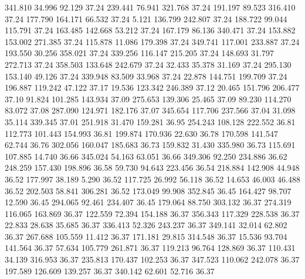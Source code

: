  341.810   34.996   92.129        37.24
 239.441   76.941  321.768        37.24
 191.197   89.523  316.410        37.24
 177.790  164.171   66.532        37.24
   5.121  136.799  242.807        37.24
 188.722   99.044  115.791        37.24
 163.485  142.668   53.212        37.24
 167.179   86.136  340.471        37.24
 153.882  153.002  271.385        37.24
 115.878   11.086  179.398        37.24
 349.741  117.001  233.887        37.24
 193.550   30.256  358.021        37.24
 339.256  116.147  215.205        37.24
 148.693   31.797  272.713        37.24
 358.503  133.648  242.679        37.24
  32.433   35.378   31.169        37.24
 295.130  153.140   49.126        37.24
 339.948   83.509   33.968        37.24
  22.878  144.751  199.709        37.24
 196.887  119.242   47.122        37.17
  19.536  123.342  246.389        37.12
  20.465  151.796  206.477        37.10
  91.824  101.285  143.934        37.09
 275.653  139.306   25.465        37.09
  89.230  114.270   83.072        37.08
 287.090  124.971  182.176        37.07
 345.654  117.706  237.566        37.04
  31.098   35.114  339.345        37.01
 251.918   31.470  159.281        36.95
 254.243  108.128  222.552        36.81
 112.773  101.443  154.993        36.81
 199.874  170.936   22.630        36.78
 170.598  141.547   62.744        36.76
 302.056  160.047  185.683        36.73
 159.832   31.430  335.980        36.73
 115.691  107.885   14.740        36.66
 345.024   54.163   63.051        36.66
 349.306   92.250  234.886        36.62
 248.259  157.430  198.896        36.58
  59.730   94.643  223.456        36.54
 218.884  142.908   44.948        36.52
 177.997   38.189    5.290        36.52
 117.725   26.992   56.118        36.52
  14.653   46.003   46.488        36.52
 202.503   58.841  306.281        36.52
 173.049   99.908  352.845        36.45
 164.427   98.707   12.590        36.45
 294.065   92.461  234.407        36.45
 179.064   88.750  303.132        36.37
 274.319  116.065  163.869        36.37
 122.559   72.394  154.188        36.37
 356.343  117.329  228.538        36.37
  22.833   28.638   35.685        36.37
 336.413   52.326  243.237        36.37
 349.141   32.014   62.802        36.37
 267.688  105.559   11.412        36.37
 171.181   29.815  314.548        36.37
  15.536   93.704  141.564        36.37
  57.634  105.779  261.871        36.37
 119.213   96.764  128.869        36.37
 110.431   34.139  316.953        36.37
 235.813  170.437  102.253        36.37
 347.523  110.062  242.078        36.37
 197.589  126.609  139.257        36.37
 340.142   62.601   52.716        36.37
